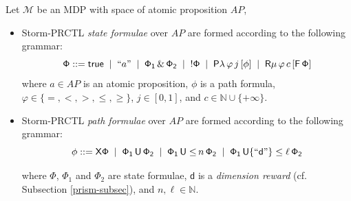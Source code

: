 \begin{definition}
Let $\mathcal{M}$ be an MDP with space of atomic proposition $AP$,
\begin{itemize}
  \item Storm-PRCTL \textit{state formulae} over $AP$ are formed according to the following grammar:
  \[ \mathsf{
    \Phi ::= true \;\; | \;\;} ``a" \;\; | \;\;\mathsf{
    \Phi_1 \, \& \, \Phi_2 \;\; | \;\; ! \Phi \;\; |
    \;\; P\lambda\,{\varphi}}\,j \mathsf{ \, [\phi] \;\; |
    \;\; R\mu\,{\varphi}\,}c \mathsf{ \,[F\, \Phi]
    }
  \]
  where $a \in AP$ is an atomic proposition, $\phi$
  is a path formula, $\varphi \in \{=, <, >, \leq,
  \geq \}$, $ j \in [0, 1]$, and $c
  \in \mathbb{N} \cup \{+\infty\}$.
  \item Storm-PRCTL \textit{path formulae} over $AP$ are formed according to the following grammar:
  \[\mathsf{
    \phi ::= X \Phi \;\; | \;\; \Phi_1 \, U \, \Phi_2
    \;\; | \;\; \Phi_1 \, U\leq }\,n\mathsf{ \, \Phi_2
    \;\; | \;\; \Phi_1 \, U\{ ``d" \}\leq \ell \, \Phi_2
  }
  \]

  where $\mathsf \Phi$, $\mathsf \Phi_1$ and
  $\mathsf \Phi_2$ are state formulae, $\mathsf d$ is a \textit{dimension reward} (cf. Subsection \ref{prism-subsec}), and $n, \ell \in \mathbb{N}$.
\end{itemize}
\end{definition}

%
%

